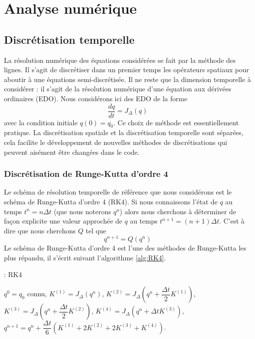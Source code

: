 \chapter{Analyse numérique}

\section{Discrétisation temporelle}

La résolution numérique des équations considérées se fait par la méthode des lignes. Il s'agit de discrétiser dans un premier temps les opérateurs spatiaux pour aboutir à une équations semi-discrétisée. Il ne reste que la dimension temporelle à considérer : il s'agit de la résolution numérique d'une équation aux dérivées ordinaires (EDO). Nous considérons ici des EDO de la forme
\begin{equation}
\dfrac{d q}{dt} = J_{\Delta} (q)
\label{eq:edo}
\end{equation}
avec la condition initiale $q(0)=q_0$. 
Ce choix de méthode est essentiellement pratique. La discrétisation spatiale et la discrétisation temporelle sont séparées, cela facilite le développement de nouvelles méthodes de discrétisations qui peuvent aisément être changées dans le code.

\subsection{Discrétisation de Runge-Kutta d'ordre 4}

Le schéma de résolution temporelle de référence que nous considérons est le schéma de Runge-Kutta d'ordre 4 (RK4). Si nous connaissons l'état de $q$ au temps $t^n = n \Delta t$ (que nous noterons $q^n$) alors nous cherchons à déterminer de façon explicite une valeur approchée de $q$ au temps $t^{n+1} = (n+1) \Delta t$. C'est à dire que nous cherchons $Q$ tel que
\begin{equation}
q^{n+1} = Q(q^n)
\end{equation}
Le schéma de Runge-Kutta d'ordre 4 est l'une des méthodes de Runge-Kutta les plus répandu, il s'écrit suivant l'algorithme \ref{alg:RK4}.

\begin{center}
\begin{minipage}[H]{12cm}
  \begin{algorithm}[H]
    \caption{: RK4}\label{alg:RK4}
    \begin{algorithmic}[1]
    \State $q^0 = q_0$ connu,
             \State  $K^{(1)} = J_{\Delta} \left( q^n \right)$,
             \State  $K^{(2)} = J_{\Delta} \left( q^n + \dfrac{\Delta t}{2} K^{(1)}\right)$,
             \State  $K^{(3)} = J_{\Delta} \left( q^n + \dfrac{\Delta t}{2} K^{(2)}\right)$,
             \State  $K^{(4)} = J_{\Delta} \left( q^n + \Delta t K^{(3)}\right)$,  
             \State  $q^{n+1} = q^n  + \dfrac{\Delta t}{6} \left( K^{(1)} + 2 K^{(2)} + 2 K^{(3)} + K^{(4)} \right)$.
            \EndFor
    \end{algorithmic}
    \end{algorithm}
\end{minipage}
\end{center}

